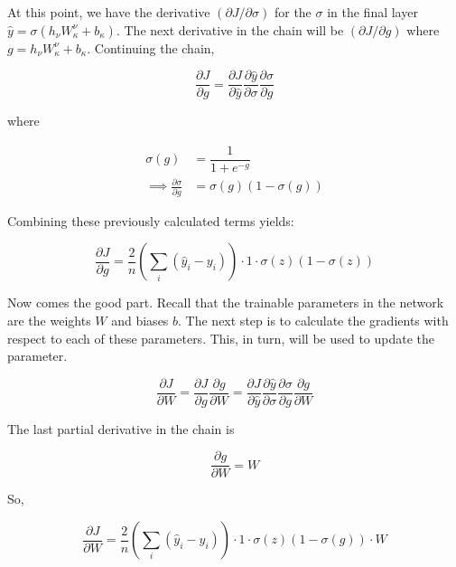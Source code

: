 \noindent At this point, we have the derivative $ (\partial J / \partial \sigma) $ for the $ \sigma $ in the final layer $ \hat{y} = \sigma \left( h_\nu W_\kappa ^\nu + b_\kappa \right) $. The next derivative in the chain will be $( \partial J / \partial g )$ where $ g = h_\nu W_\kappa ^\nu + b_\kappa $. Continuing the chain,

\begin{equation}
\frac{\partial J}{\partial g} = \frac{\partial J}{\partial \hat{y}} \frac{\partial \hat{y}}{\partial \sigma} \frac{\partial \sigma}{\partial g}
\end{equation}

\noindent where

\begin{align}
\sigma(g) &= \dfrac{1}{1 + e^{-g}} \\
\implies \frac{\partial \sigma}{\partial g} &= \sigma(g)(1 - \sigma(g))
\end{align}

\noindent Combining these previously calculated terms yields:

\begin{equation}
\frac{\partial J}{\partial g} = \frac{2}{n} \left( \sum_i (\hat{y}_i - y_i ) \right) \cdot 1 \cdot  \sigma(z)(1 - \sigma(z))
\end{equation}

Now comes the good part. Recall that the trainable parameters in the network are the weights $ W $ and biases $ b $. The next step is to calculate the gradients with respect to each of these parameters. This, in turn, will be used to update the parameter.

\begin{equation}
\frac{\partial J}{\partial W} = \frac{\partial J}{\partial g}\frac{\partial g}{\partial W} = \frac{\partial J}{\partial \hat{y}} \frac{\partial \hat{y}}{\partial \sigma} \frac{\partial \sigma}{\partial g} \frac{\partial g}{\partial W}
\end{equation}

\noindent The last partial derivative in the chain is

\begin{equation}
\frac{\partial g}{\partial W} = W
\end{equation}


\noindent So,

\begin{equation}
\frac{\partial J}{\partial W} = \frac{2}{n} \left( \sum_i (\hat{y}_i - y_i ) \right) \cdot 1 \cdot  \sigma(z)(1 - \sigma(g)) \cdot W
\end{equation}

